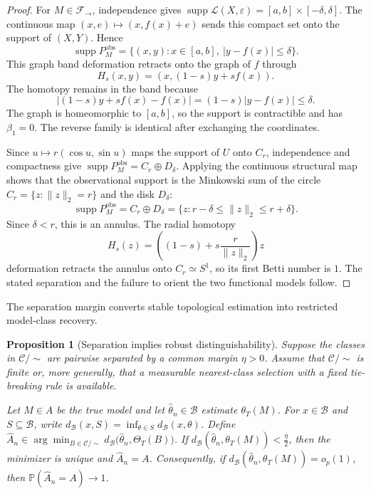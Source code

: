 \documentclass[11pt,a4paper]{article}
\theoremstyle{plain}
\newtheorem{proposition}[theorem]{Proposition}
\theoremstyle{definition}
\theoremstyle{remark}
\newcommand{\1}{\mathbbm{1}}
\begin{document}
\begin{proof}
For \(M\in\mathcal F_\to\), independence gives
\(\operatorname{supp}\mathcal L(X,\varepsilon) = [a,b]\times[-\delta,\delta]\). The continuous map \((x,e)\mapsto(x,f(x)+e)\) sends this compact set onto the
support of \((X,Y)\). Hence
\[
\operatorname{supp}P_M^{\mathrm{obs}}
=
\{(x,y):x\in[a,b],\ |y-f(x)|\leq\delta\}.
\]
This graph band deformation retracts onto the graph of \(f\) through
\[
H_s(x,y)
=
(x,(1-s)y+s f(x)).
\]
The homotopy remains in the band because
\[
|(1-s)y+s f(x)-f(x)|
=
(1-s)|y-f(x)|
\leq\delta.
\]
The graph is homeomorphic to \([a,b]\), so the support is contractible and has \(\beta_1=0\). The reverse family is identical after exchanging the coordinates.

Since \(u\mapsto r(\cos u,\sin u)\) maps the support of \(U\) onto \(C_r\), independence and compactness give
\(\operatorname{supp}P_M^{\mathrm{obs}} =C_r\oplus D_\delta\). Applying the continuous structural map shows that the observational support is the Minkowski sum of
the circle \(C_r=\{z:\|z\|_2=r\}\) and the disk \(D_\delta\):
\[
\operatorname{supp}P_M^{\mathrm{obs}}
=
C_r\oplus D_\delta
=
\{z:r-\delta\leq\|z\|_2\leq r+\delta\}.
\]
Since \(\delta<r\), this is an annulus. The radial homotopy
\[
H_s(z)
=
\left(
(1-s)+s\frac{r}{\|z\|_2}
\right)z
\]
deformation retracts the annulus onto \(C_r\simeq S^1\), so its first Betti number is \(1\). The stated separation and the failure to orient the two functional models follow.
\end{proof}

The separation margin converts stable topological estimation into restricted model-class recovery.

\begin{proposition}[Separation implies robust distinguishability]
\label{prop:stability-separation-discovery}
Suppose the classes in \(\mathcal C/{\sim}\) are pairwise
separated by a common margin \(\eta>0\). Assume that
\(\mathcal C/{\sim}\) is finite or, more generally, that a
measurable nearest-class selection with a fixed tie-breaking
rule is available.

Let \(M\in A\) be the true model and let
\(\widehat\theta_n\in\mathcal B\) estimate \(\theta_T(M)\).
For \(x\in\mathcal B\) and \(S\subseteq\mathcal B\), write
\(d_{\mathcal B}(x,S) = \inf_{\theta\in S}d_{\mathcal B}(x,\theta)\). Define
\(\widehat A_n \in \arg\min_{B\in\mathcal C/{\sim}}
d_{\mathcal B}\bigl(\widehat\theta_n,\Theta_T(B)\bigr)\). If
\(d_{\mathcal B}(\widehat\theta_n,\theta_T(M)) < \frac{\eta}{2}\), then the minimizer is unique and
\(\widehat A_n=A\). Consequently, if \(d_{\mathcal B}(\widehat\theta_n,\theta_T(M)) = o_p(1)\), then
\(\mathbb P(\widehat A_n=A)\longrightarrow1\).
\end{proposition}
\end{document}
